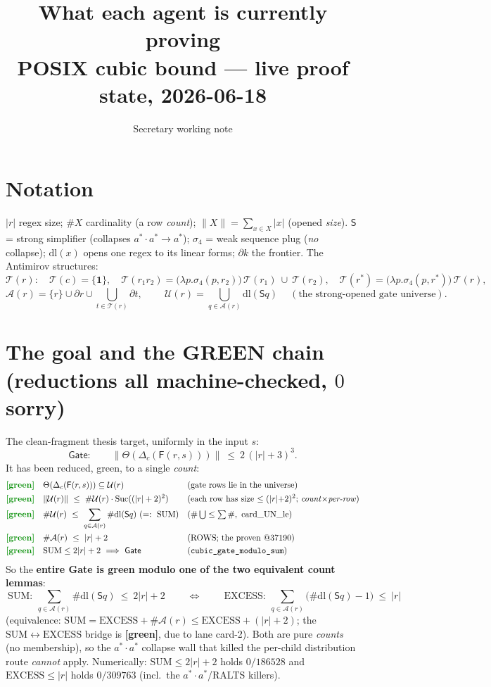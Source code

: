 \documentclass[11pt]{article}
\title{\textbf{What each agent is currently proving}\\[2pt]
\large POSIX cubic bound --- live proof state, 2026-06-18}
\author{Secretary working note}\date{}
\newcommand{\rs}[1]{\lvert #1\rvert}                 %
\newcommand{\rss}[1]{\lVert #1\rVert}                %
\newcommand{\card}[1]{\##1}                           %
\newcommand{\Strong}{\mathsf{S}}                     %
\newcommand{\sigf}{\sigma_{\!4}}                     %
\newcommand{\dlf}{\mathrm{dl}}                       %
\newcommand{\dpar}{\partial}                         %
\newcommand{\Terms}{\mathcal{T}}                     %
\newcommand{\Rows}{\mathcal{A}}                      %
\newcommand{\Univ}{\mathcal{U}}                      %
\newcommand{\Gate}{\mathsf{Gate}}
\newcommand{\seq}{\cdot}\newcommand{\one}{\mathbf 1}\newcommand{\zero}{\mathbf 0}
\newcommand{\GREEN}{\textcolor{green!55!black}{\textbf{[green]}}}
\begin{document}
\maketitle

\section{Notation}
$\rs r$ regex size; $\card X$ cardinality (a row \emph{count}); $\rss X=\sum_{x\in X}\rs x$ (opened
\emph{size}). $\Strong$ = strong simplifier (collapses $a^{*}\seq a^{*}\!\to a^{*}$); $\sigf$ = weak
sequence plug (\emph{no} collapse); $\dlf(x)$ opens one regex to its linear forms; $\dpar k$ the frontier.
The Antimirov structures:
\[
\Terms(r):\quad \Terms(c)=\{\one\},\quad
\Terms(r_1r_2)=\bigl(\lambda p.\sigf(p,r_2)\bigr)\,\Terms(r_1)\ \cup\ \Terms(r_2),\quad
\Terms(r^{*})=\bigl(\lambda p.\sigf(p,r^{*})\bigr)\,\Terms(r),
\]
\[
\Rows(r)=\{r\}\cup\dpar r\cup\!\!\bigcup_{t\in\Terms(r)}\!\!\dpar t,\qquad
\boxed{\ \Univ(r)=\bigcup_{q\in\Rows(r)}\dlf(\Strong q)\ }\quad(\text{the strong-opened gate universe}).
\]

\section{The goal and the GREEN chain (reductions all machine-checked, $0$ sorry)}
The clean-fragment thesis target, uniformly in the input $s$:
\[
\Gate:\qquad \rss{\Theta(\Delta_c(\mathsf F(r,s)))}\ \le\ 2\,(\rs r+3)^3 .
\]
It has been reduced, green, to a single \emph{count}:
\begin{align}
&\GREEN\quad \Theta(\Delta_c(\mathsf F(r,s)))\subseteq \Univ(r)
   &&\text{(gate rows lie in the universe)}\\
&\GREEN\quad \rss{\Univ(r)}\ \le\ \card{\Univ(r)}\cdot \mathrm{Suc}((\rs r+2)^2)
   &&\text{(each row has size $\le(\rs r{+}2)^2$; \emph{count}$\times$\emph{per-row})}\\
&\GREEN\quad \card{\Univ(r)}\ \le\ \sum_{q\in\Rows(r)}\card{\dlf(\Strong q)}\ (=:\ \mathrm{SUM})
   &&\text{(}\card{\textstyle\bigcup}\le\textstyle\sum\card{},\ \text{card\_UN\_le)}\\
&\GREEN\quad \card{\Rows(r)}\ \le\ \rs r+2
   &&\text{(ROWS; the proven @37190)}\\
&\GREEN\quad \mathrm{SUM}\le 2\rs r+2\ \Longrightarrow\ \Gate
   &&\text{(\texttt{cubic\_gate\_modulo\_sum})}
\end{align}
So the \textbf{entire Gate is green modulo one of the two equivalent count lemmas}:
\[
\boxed{\ \mathrm{SUM}:\ \sum_{q\in\Rows(r)}\card{\dlf(\Strong q)}\ \le\ 2\rs r+2\ }
\qquad\Longleftrightarrow\qquad
\boxed{\ \mathrm{EXCESS}:\ \sum_{q\in\Rows(r)}\bigl(\card{\dlf(\Strong q)}-1\bigr)\ \le\ \rs r\ }
\]
(equivalence: $\mathrm{SUM}=\mathrm{EXCESS}+\card{\Rows(r)}\le \mathrm{EXCESS}+(\rs r+2)$; the
$\mathrm{SUM}\!\leftrightarrow\!\mathrm{EXCESS}$ bridge is \GREEN, due to lane card-2). Both are pure
\emph{counts} (no membership), so the $a^{*}\seq a^{*}$ collapse wall that killed the per-child
distribution route \emph{cannot} apply. Numerically: $\mathrm{SUM}\le 2\rs r+2$ holds $0/186528$ and
$\mathrm{EXCESS}\le\rs r$ holds $0/309763$ (incl.\ the $a^{*}\seq a^{*}$/RALTS killers).
\end{document}
